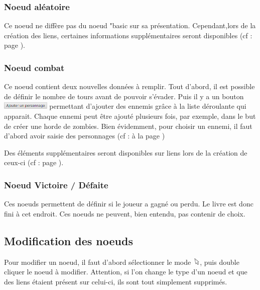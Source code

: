 			\subsubsection{Noeud aléatoire}

				Ce noeud ne diffère pas du noeud "basic sur sa présentation. Cependant,lors de la création des liens, certaines informations supplémentaires seront disponibles (cf :  page \pageref{subsubsec:lienAléatoire}).

			\subsubsection{Noeud combat}
				\label{subsubsec:combat}

				Ce noeud contient deux nouvelles données à remplir. Tout d'abord, il est possible de définir le nombre de tours avant de pouvoir s'évader. Puis il y a un bouton \includegraphics[height=10pt]{img/noeudAddPersonnage} permettant d'ajouter des ennemis grâce à la liste déroulante qui apparait. Chaque ennemi peut être ajouté plusieurs fois, par exemple, dans le but de créer une horde de zombies. Bien évidemment, pour choisir un ennemi, il faut d'abord avoir saisie des personnages (cf :  à la page \pageref{sec:perso})

				Des éléments supplémentaires seront disponibles sur liens lors de la création de ceux-ci (cf :  page \pageref{subsubsec:lienCombat}).

			\subsubsection{Noeud Victoire / Défaite}

				Ces noeuds permettent de définir si le joueur a gagné ou perdu. Le livre est donc fini à cet endroit. Ces noeuds ne peuvent, bien entendu, pas contenir de choix.

		\subsection{Modification des noeuds}

			Pour modifier un noeud, il faut d'abord sélectionner le mode \includegraphics[height=10pt, keepaspectratio]{img/icons/select.png}, puis double cliquer le noeud à modifier. Attention, si l'on change le type d'un noeud et que des liens étaient présent sur celui-ci, ils sont tout simplement supprimés.

